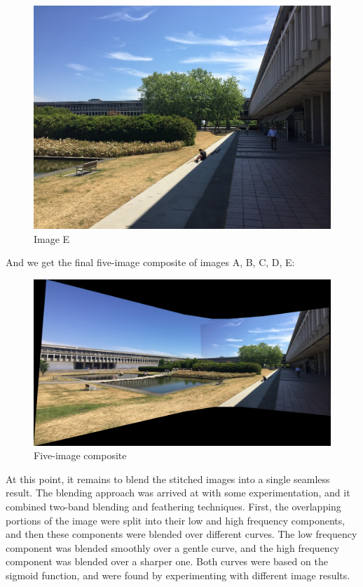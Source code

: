 \documentclass[]{article}
\begin{document}
\begin{figure}[h]
	\includegraphics[scale=0.25]{results/p1_noblend/E}
	\centering
	\caption{Image E}
\end{figure}

And we get the final five-image composite of images A, B, C, D, E:
\vspace{30mm}

\begin{figure}[h]
	\includegraphics[scale=0.2]{results/p1_noblend/16}
	\centering
	\caption{Five-image composite}
\end{figure}

At this point, it remains to blend the stitched images into a single seamless result. The blending approach was arrived at with some experimentation, and it combined two-band blending and feathering techniques. First, the overlapping portions of the image were split into their low and high frequency components, and then these components were blended over different curves. The low frequency component was blended smoothly over a gentle curve, and the high frequency component was blended over a sharper one. Both curves were based on the sigmoid function, and were found by experimenting with different image results.
\end{document}
